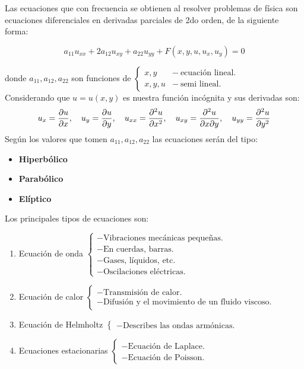 \documentclass[../main]{subfiles}
\begin{document}
Las ecuaciones que con frecuencia se obtienen al resolver problemas de física son ecuaciones diferenciales en derivadas parciales de 2do orden, de la siguiente forma:

\begin{equation}
    a_{11}u_{xx}+2a_{12}u_{xy}+a_{22} u_{yy}+F(x,y,u,u_x,u_y)=0
\end{equation}

donde $a_{11}, a_{12}, a_{22}$ son funciones de 
$
\left\{ \begin{array}{ll}
         x,y & - \ \text{ecuación lineal}.\\
        x,y,u & - \ \text{semi lineal}.\end{array} \right. 
$ \\
Considerando que $u=u(x,y)$ es nuestra función incógnita y sus derivadas son:
\begin{align}
    u_x=\pdv{u}{x}, \quad u_y=\pdv{u}{y}, \quad u_{xx}=\pdv{^2 u}{x^2}, \quad u_{xy}=\pdv{^2 u}{x \partial y}, \quad u_{yy}=\pdv{^2 u}{y^2}
\end{align}
Según los valores que tomen $a_{11}, a_{12}, a_{22}$ las ecuaciones serán del tipo:
\begin{itemize}
    \item \textbf{Hiperbólico}
    \item \textbf{Parabólico}
    \item \textbf{Elíptico}
\end{itemize}
Los principales tipos de ecuaciones son:
\begin{enumerate}
    \item Ecuación de onda 
    $
    \left\{ \begin{array}{ll}
             -\text{Vibraciones mecánicas pequeñas.}\\
             -\text{En cuerdas, barras.}\\
             -\text{Gases, líquidos, etc.}\\
             -\text{Oscilaciones eléctricas.}\end{array} \right. 
    $
    \item Ecuación de calor
    $
    \left\{ \begin{array}{ll}
             -\text{Transmisión de calor.}\\
             -\text{Difusión y el movimiento de un fluido viscoso.}\end{array} \right. 
    $
    \item Ecuación de Helmholtz
    $
    \left\{ \begin{array}{ll}
             -\text{Describes las ondas armónicas.}\end{array} \right. 
    $
    \item Ecuaciones estacionarias
    $
    \left\{ \begin{array}{ll}
             -\text{Ecuación de Laplace.}\\
             -\text{Ecuación de Poisson.}\end{array} \right. 
    $
\end{enumerate}
\end{document}
